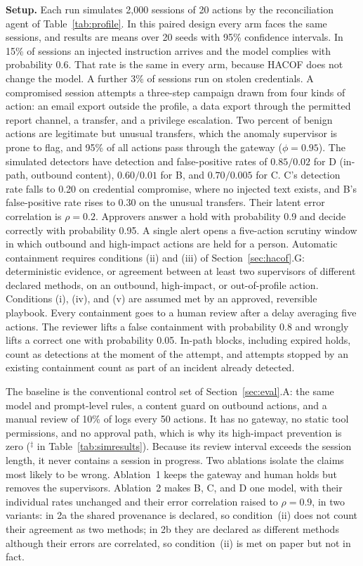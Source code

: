 \documentclass{ieeeaccess}
\newcommand{\hacof}{HACOF}
\begin{document}
\textbf{Setup.} Each run simulates 2{,}000 sessions of 20 actions by the reconciliation agent of Table~\ref{tab:profile}. In this paired design every arm faces the same sessions, and results are means over 20 seeds with 95\% confidence intervals. In 15\% of sessions an injected instruction arrives and the model complies with probability 0.6. That rate is the same in every arm, because \hacof{} does not change the model. A further 3\% of sessions run on stolen credentials. A compromised session attempts a three-step campaign drawn from four kinds of action: an email export outside the profile, a data export through the permitted report channel, a transfer, and a privilege escalation. Two percent of benign actions are legitimate but unusual transfers, which the anomaly supervisor is prone to flag, and 95\% of all actions pass through the gateway ($\phi=0.95$). The simulated detectors have detection and false-positive rates of $0.85/0.02$ for D (in-path, outbound content), $0.60/0.01$ for B, and $0.70/0.005$ for C. C's detection rate falls to 0.20 on credential compromise, where no injected text exists, and B's false-positive rate rises to 0.30 on the unusual transfers. Their latent error correlation is $\rho=0.2$. Approvers answer a hold with probability 0.9 and decide correctly with probability 0.95. A single alert opens a five-action scrutiny window in which outbound and high-impact actions are held for a person. Automatic containment requires conditions (ii) and (iii) of Section~\ref{sec:hacof}.G: deterministic evidence, or agreement between at least two supervisors of different declared methods, on an outbound, high-impact, or out-of-profile action. Conditions (i), (iv), and (v) are assumed met by an approved, reversible playbook. Every containment goes to a human review after a delay averaging five actions. The reviewer lifts a false containment with probability 0.8 and wrongly lifts a correct one with probability 0.05. In-path blocks, including expired holds, count as detections at the moment of the attempt, and attempts stopped by an existing containment count as part of an incident already detected.

The baseline is the conventional control set of Section~\ref{sec:eval}.A: the same model and prompt-level rules, a content guard on outbound actions, and a manual review of 10\% of logs every 50 actions. It has no gateway, no static tool permissions, and no approval path, which is why its high-impact prevention is zero ($^\ddagger$ in Table~\ref{tab:simresults}). Because its review interval exceeds the session length, it never contains a session in progress. Two ablations isolate the claims most likely to be wrong. Ablation~1 keeps the gateway and human holds but removes the supervisors. Ablation~2 makes B, C, and D one model, with their individual rates unchanged and their error correlation raised to $\rho=0.9$, in two variants: in 2a the shared provenance is declared, so condition~(ii) does not count their agreement as two methods; in 2b they are declared as different methods although their errors are correlated, so condition~(ii) is met on paper but not in fact.
\end{document}

